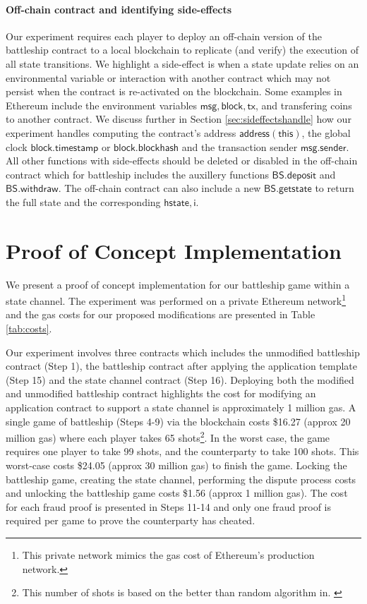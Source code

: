 \documentclass{llncs}
\newcommand{\hstate}{\mathsf{hstate}}
\newcommand{\monotoniccounter}{\mathsf{i}}
\newcommand{\battleshipdeposit}{\mathsf{BS.deposit}}
\newcommand{\battleshipwithdraw}{\mathsf{BS.withdraw}}
\newcommand{\battleshipgetstate}{\mathsf{BS.getstate}}
\begin{document}
\paragraph{Off-chain contract and identifying side-effects} \label{sec:timers}

Our experiment requires each player to deploy an off-chain version of the battleship contract to a local blockchain to replicate (and verify) the execution of all state transitions. 
We highlight a side-effect is when a state update relies on an environmental variable or interaction with another contract which may not persist when the contract is re-activated on the blockchain. 
Some examples in Ethereum include the environment variables $\mathsf{msg}, \mathsf{block}, \mathsf{tx}$, and transfering coins to another contract. 
We discuss further in Section \ref{sec:sideffectshandle} how our experiment handles computing the contract's address $\mathsf{address(this)}$, the global clock $\mathsf{block.timestamp}$ or $\mathsf{block.blockhash}$ and the transaction sender $\mathsf{msg.sender}$. 
All other functions with side-effects should be deleted or disabled in the off-chain contract which for battleship includes the auxillery functions $\battleshipdeposit$ and $\battleshipwithdraw$. 
The off-chain contract can also include a new $\battleshipgetstate$ to return the full state and the corresponding $\hstate,\monotoniccounter$. 

\section{Proof  of Concept Implementation}

We present a proof of concept implementation for our battleship game within a state channel.
The experiment was performed on a private Ethereum network\footnote{This private network mimics the gas cost of Ethereum's production network.} and the gas costs for our proposed modifications are presented in Table \ref{tab:costs}. 

Our experiment involves three contracts which includes the unmodified battleship contract (Step 1), the battleship contract after applying the application template (Step 15) and the state channel contract (Step 16). 
Deploying both the modified and unmodified battleship contract highlights the cost for modifying an application contract to support a state channel is approximately 1 million gas. 
A single game of battleship (Steps 4-9) via the blockchain costs \$16.27 (approx 20 million gas) where each player takes 65 shots\footnote{This number of shots is based on the better than random algorithm in. \cite{battleshipdata}}.
In the worst case, the game requires one player to take 99 shots, and the counterparty to take 100 shots. 
This worst-case costs \$24.05 (approx 30 million gas) to finish the game.  
Locking the battleship game, creating the state channel, performing the dispute process costs and unlocking the battleship game costs \$1.56 (approx 1 million gas). 
The cost for each fraud proof is presented in Steps 11-14 and only one fraud proof is required per game to prove the counterparty has cheated. 
\end{document}
